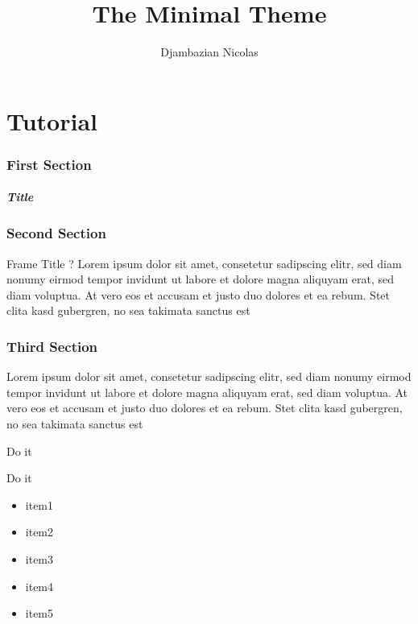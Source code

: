 \documentclass[12pt, francais]{beamer}
\title{The Minimal Theme}
\date{}
\author{Djambazian Nicolas}
\begin{document}

\maketitle

\part{Tutorial}
\framepartpage

\section*{First Section }
\begin{frame}
	\frametitle{Title}
	\tableofcontents[hideallsubsections]
\end{frame}

\section{Second Section }

\begin{frame}{Frame Title ?}
	Lorem ipsum dolor sit amet, consetetur sadipscing elitr, sed diam nonumy eirmod tempor invidunt ut labore et dolore magna aliquyam erat, sed diam voluptua. At vero eos et accusam et justo duo dolores et ea rebum. Stet clita kasd gubergren, no sea takimata sanctus est
\end{frame}


\section{Third Section }

\begin{frame}
\end{frame}


\begin{frame}
	Lorem ipsum dolor sit amet, consetetur sadipscing elitr, sed diam nonumy eirmod tempor invidunt ut labore et dolore magna aliquyam erat, sed diam voluptua. At vero eos et accusam et justo duo dolores et ea rebum. Stet clita kasd gubergren, no sea takimata sanctus est
\end{frame}



\begin{frame}{Do it}
\end{frame}



\begin{frame}{Do it}
	  \begin{itemize}
	    \centering
	    \item item1
	    \item item2
	    \item item3
	    \item item4
	    \item item5
	  \end{itemize}
\end{frame}


\end{document}
